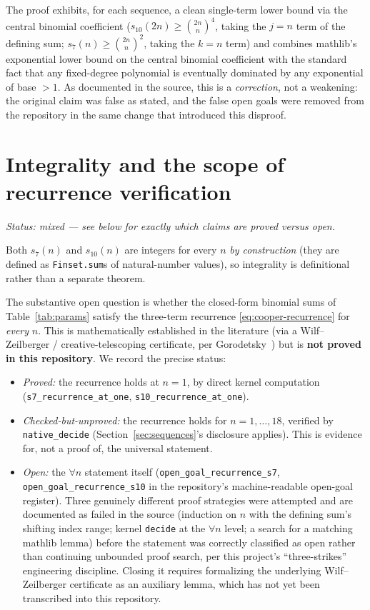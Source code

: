 \documentclass[11pt]{article}
\begin{document}
The proof exhibits, for each sequence, a clean single-term lower bound via the
central binomial coefficient ($s_{10}(2n)\ge \binom{2n}{n}^4$, taking the
$j=n$ term of the defining sum; $s_7(n) \ge \binom{2n}{n}^2$, taking the $k=n$
term) and combines mathlib's exponential lower bound on the central binomial
coefficient with the standard fact that any fixed-degree polynomial is
eventually dominated by any exponential of base $>1$. As documented in the
source, this is a \emph{correction}, not a weakening: the original claim was
false as stated, and the false open goals were removed from the repository in
the same change that introduced this disproof.

\section{Integrality and the scope of recurrence verification}
\label{sec:integrality}

\emph{Status: mixed --- see below for exactly which claims are proved versus
open.}

Both $s_7(n)$ and $s_{10}(n)$ are integers for every $n$ \emph{by
construction} (they are defined as \lstinline{Finset.sum}s of natural-number
values), so integrality is definitional rather than a separate theorem.

The substantive open question is whether the closed-form binomial sums of
Table~\ref{tab:params} satisfy the three-term recurrence
\eqref{eq:cooper-recurrence} for \emph{every} $n$. This is mathematically
established in the literature (via a Wilf--Zeilberger / creative-telescoping
certificate, per Gorodetsky~\cite{Gorodetsky2023}) but is \textbf{not proved
in this repository}. We record the precise status:

\begin{itemize}
  \item \emph{Proved:} the recurrence holds at $n=1$, by direct kernel
    computation (\lstinline{s7_recurrence_at_one}, \lstinline{s10_recurrence_at_one}).
  \item \emph{Checked-but-unproved:} the recurrence holds for
    $n=1,\dots,18$, verified by \texttt{native\_decide}
    (Section~\ref{sec:sequences}'s disclosure applies). This is evidence for,
    not a proof of, the universal statement.
  \item \emph{Open:} the $\forall n$ statement itself
    (\lstinline{open_goal_recurrence_s7}, \lstinline{open_goal_recurrence_s10}
    in the repository's machine-readable open-goal register). Three genuinely
    different proof strategies were attempted and are documented as failed in
    the source (induction on $n$ with the defining sum's shifting index range;
    kernel \texttt{decide} at the $\forall n$ level; a search for a matching
    mathlib lemma) before the statement was correctly classified as open
    rather than continuing unbounded proof search, per this project's
    ``three-strikes'' engineering discipline. Closing it requires formalizing
    the underlying Wilf--Zeilberger certificate as an auxiliary lemma, which
    has not yet been transcribed into this repository.
\end{itemize}
\end{document}

